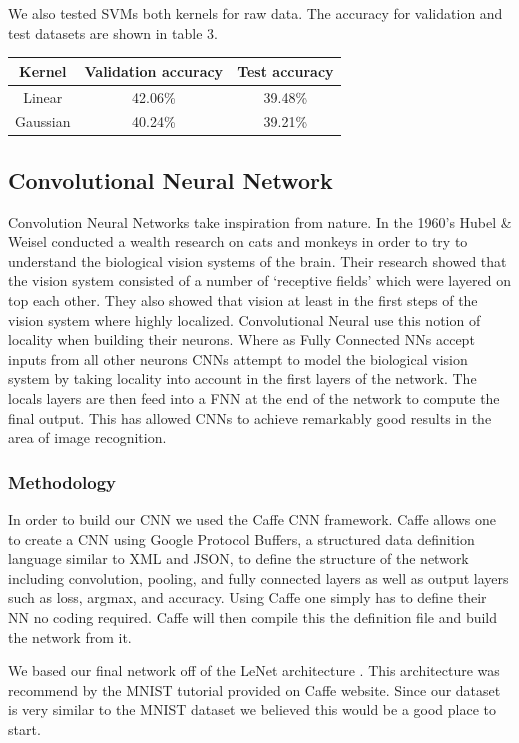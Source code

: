 \documentclass[10pt,twocolumn]{article}
\begin{document}
We also tested SVMs both kernels for raw data. The accuracy for validation and test datasets are shown in table 3.
\\

\begin{tabular}{|c|c|c|}
\hline
Kernel & Validation accuracy & Test accuracy \\ \hline
Linear & 42.06\% & 39.48\% \\
Gaussian & 40.24\% & 39.21\% \\
\hline
\end{tabular}


\subsection{Convolutional Neural Network}
Convolution Neural Networks take inspiration from nature. In the 1960's Hubel \& Weisel conducted a wealth research on cats and monkeys in order to try to understand the biological vision systems of the brain. Their research showed that the vision system consisted of a number of `receptive fields' which were layered on top each other. They also showed that vision at least in the first steps of the vision system where highly localized. Convolutional Neural use this notion of locality when building their neurons. Where as Fully Connected NNs accept inputs from all other neurons CNNs attempt to model the biological vision system by taking locality into account in the first layers of the network. The locals layers are then feed into a FNN at the end of the network to compute the final output. This has allowed CNNs to achieve remarkably good results in the area of image recognition. 
\subsubsection{Methodology}
In order to build our CNN we used the Caffe CNN framework\cite{jia2014caffe}. Caffe allows one to create a CNN using Google Protocol Buffers, a structured data definition language similar to XML and JSON, to define the structure of the network including convolution, pooling, and fully connected layers as well as output layers such as loss, argmax, and accuracy. Using Caffe one simply has to define their NN no coding required. Caffe will then compile this the definition file and build the network from it.

We based our final network off of the LeNet architecture \cite{leCunnGradient}. This architecture was recommend by the MNIST tutorial provided on Caffe website. Since our dataset is very similar to the MNIST dataset we believed this would be a good place to start. 
\end{document}
